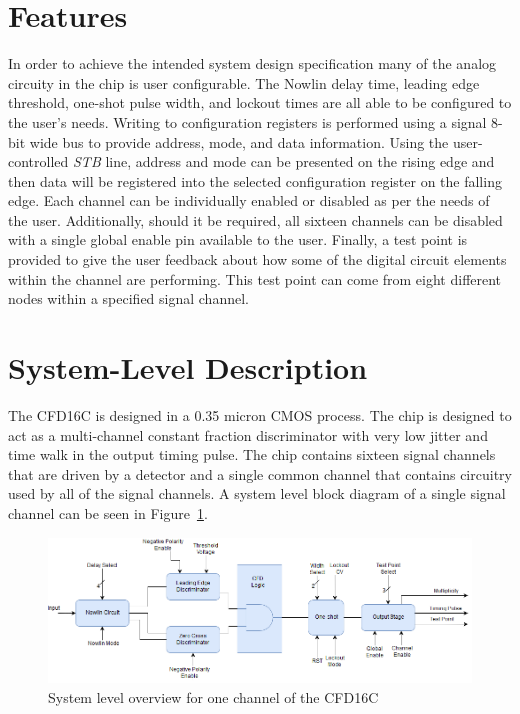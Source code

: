 \documentclass[12pt,oneside,final]{siuethesis}
\theoremstyle{definition}
\begin{document}
\section{Features}
\par In order to achieve the intended system design specification many of the analog circuity in the chip is user configurable. The  Nowlin delay time, leading edge threshold, one-shot pulse width, and lockout times are all able to be configured to the user's needs. Writing to configuration registers is performed using a signal 8-bit wide bus to provide address, mode, and data information. Using the user-controlled \emph{STB} line, address and mode can be presented on the rising edge and then data will be registered into the selected configuration register on the falling edge. Each channel can be individually enabled or disabled as per the needs of the user. Additionally, should it be required, all sixteen channels can be disabled with a single global enable pin available to the user. Finally, a test point is provided to give the user feedback about how some of the digital circuit elements within the channel are performing. This test point can come from eight different nodes within a specified signal channel.

\section{System-Level Description}
\par The CFD16C is designed in a 0.35 micron CMOS process. The chip is designed to act as a multi-channel constant fraction discriminator with very low jitter and time walk in the output timing pulse. The chip contains sixteen signal channels that are driven by a detector and a single common channel that contains circuitry used by all of the signal channels. A system level block diagram of a single signal channel can be seen in Figure~\ref{fig:CFD}.

\begin{figure}[ht]
\centering
\includegraphics[scale=.47,keepaspectratio=true]{./ch2_figures/channel_block.png} 
\caption{System level overview for one channel of the CFD16C}
\label{fig:CFD}
\end{figure}
\end{document}
